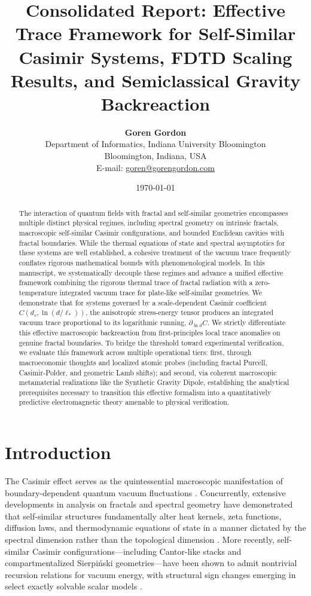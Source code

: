 \documentclass[12pt,letterpaper]{article}
\title{\textbf{Consolidated Report: Effective Trace Framework for Self-Similar Casimir Systems, FDTD Scaling Results, and Semiclassical Gravity Backreaction}}
\author{\textbf{Goren Gordon} \\
Department of Informatics, Indiana University Bloomington \\
Bloomington, Indiana, USA \\
E-mail: \href{mailto:goren@gorengordon.com}{goren@gorengordon.com}}
\date{\today}
\begin{document}
\maketitle

\begin{abstract}
The interaction of quantum fields with fractal and self-similar geometries encompasses multiple distinct physical regimes, including spectral geometry on intrinsic fractals, macroscopic self-similar Casimir configurations, and bounded Euclidean cavities with fractal boundaries.
While the thermal equations of state and spectral asymptotics for these systems are well established, a cohesive treatment of the vacuum trace frequently conflates rigorous mathematical bounds with phenomenological models.
In this manuscript, we systematically decouple these regimes and advance a unified effective framework combining the rigorous thermal trace of fractal radiation with a zero-temperature integrated vacuum trace for plate-like self-similar geometries.
We demonstrate that for systems governed by a scale-dependent Casimir coefficient $C(d_s, \ln(d/\ell_*))$, the anisotropic stress-energy tensor produces an integrated vacuum trace proportional to its logarithmic running, $\partial_{\ln d}C$.
We strictly differentiate this effective macroscopic backreaction from first-principles local trace anomalies on genuine fractal boundaries.
To bridge the threshold toward experimental verification, we evaluate this framework across multiple operational tiers: first, through macroeconomic thoughts and localized atomic probes (including fractal Purcell, Casimir-Polder, and geometric Lamb shifts); and second, via coherent macroscopic metamaterial realizations like the Synthetic Gravity Dipole, establishing the analytical prerequisites necessary to transition this effective formalism into a quantitatively predictive electromagnetic theory amenable to physical verification.
\end{abstract}

\newpage
\section{Introduction}
The Casimir effect serves as the quintessential macroscopic manifestation of boundary-dependent quantum vacuum fluctuations \cite{casimir1948}.
Concurrently, extensive developments in analysis on fractals and spectral geometry have demonstrated that self-similar structures fundamentally alter heat kernels, zeta functions, diffusion laws, and thermodynamic equations of state in a manner dictated by the spectral dimension rather than the topological dimension \cite{akkermans2010,kigami2001,kajino2010}.
More recently, self-similar Casimir configurations---including Cantor-like stacks and compartmentalized Sierpi\'nski geometries---have been shown to admit nontrivial recursion relations for vacuum energy, with structural sign changes emerging in select exactly solvable scalar models \cite{shajesh2016,shajesh2017}.
\end{document}
